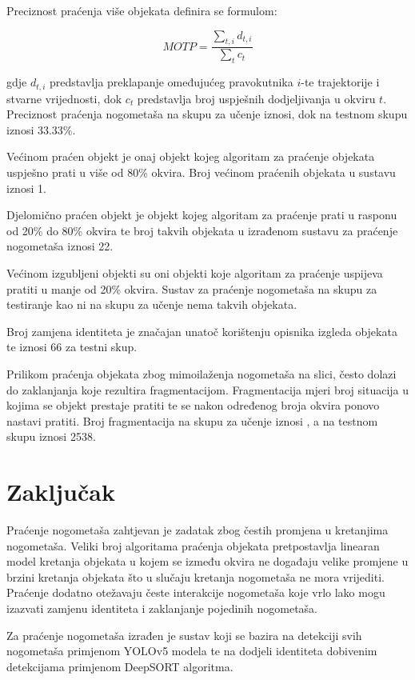 \documentclass[times, utf8, seminar, numeric]{fer}
\begin{document}
Preciznost praćenja više objekata definira se formulom:

\[MOTP = \frac{\sum_{t,i} d_{t,i}}{\sum_{t} c_t}\]

gdje \(d_{t,i}\) predstavlja preklapanje omeđujućeg pravokutnika \(i\)-te trajektorije i stvarne vrijednosti, dok \(c_t\) predstavlja broj uspješnih dodjeljivanja u okviru \(t\). Preciznost praćenja nogometaša na skupu za učenje iznosi, dok na testnom skupu iznosi 33.33\%.


Većinom praćen objekt je onaj objekt kojeg algoritam za praćenje objekata uspješno prati u više od 80\% okvira. Broj većinom praćenih objekata u sustavu iznosi 1.

Djelomično praćen objekt je objekt kojeg algoritam za praćenje prati u rasponu od 20\% do 80\% okvira te broj takvih objekata u izrađenom sustavu za praćenje nogometaša iznosi 22.

Većinom izgubljeni objekti su oni objekti koje algoritam za praćenje uspijeva pratiti u manje od 20\% okvira. Sustav za praćenje nogometaša na skupu za testiranje kao ni na skupu za učenje nema takvih objekata.

Broj zamjena identiteta je značajan unatoč korištenju opisnika izgleda objekata te iznosi 66 za testni skup.

Prilikom praćenja objekata zbog mimoilaženja nogometaša na slici, često dolazi do zaklanjanja koje rezultira fragmentacijom. Fragmentacija mjeri broj situacija u kojima se objekt prestaje pratiti te se nakon određenog broja okvira ponovo nastavi pratiti. Broj fragmentacija na skupu za učenje iznosi , a na testnom skupu iznosi 2538.


\chapter{Zaključak}

Praćenje nogometaša zahtjevan je zadatak zbog čestih promjena u kretanjima nogometaša. Veliki broj algoritama praćenja objekata pretpostavlja linearan model kretanja objekata u kojem se između okvira ne događaju velike promjene u brzini kretanja objekata što u slučaju kretanja nogometaša ne mora vrijediti. Praćenje dodatno otežavaju česte interakcije nogometaša koje vrlo lako mogu izazvati zamjenu identiteta i zaklanjanje pojedinih nogometaša. 

Za praćenje nogometaša izrađen je sustav koji se bazira na detekciji svih nogometaša primjenom YOLOv5 modela te na dodjeli identiteta dobivenim detekcijama primjenom DeepSORT algoritma. 
\end{document}
